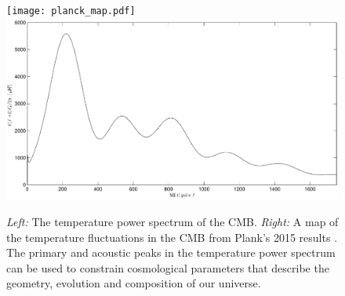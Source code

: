 \documentclass[12pt]{article}
\begin{document}
\begin{figure}
	\center
	\texttt{[image: planck\_map.pdf]}
	\includegraphics[width=.4\textwidth]{temp_aps.pdf}
	\caption{\textit{Left:} The temperature power spectrum of the CMB.
	\textit{Right:} A map of the temperature fluctuations in the CMB from
	Plank's 2015 results \cite{cite:planckmap}. The primary and acoustic peaks
	in the temperature power spectrum can be used to constrain cosmological
	parameters that describe the geometry, evolution and composition of our
	universe.}
	\label{fig:temp_aps}

\end{figure}



\end{document}
